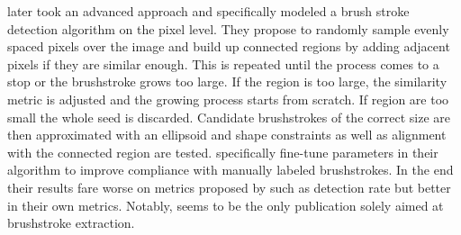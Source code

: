 \citeauthor*{lamberti} later took an advanced approach and specifically modeled a brush stroke detection algorithm on the pixel level.
They propose to randomly sample evenly spaced pixels over the image and build up connected regions by adding adjacent pixels if they are similar enough.
This is repeated until the process comes to a stop or the brushstroke grows too large.
If the region is too large, the similarity metric is adjusted and the growing process starts from scratch.
If region are too small the whole seed is discarded.
Candidate brushstrokes of the correct size are then approximated with an ellipsoid and shape constraints as well as alignment with the connected region are tested.
\citeauthor*{lamberti} specifically fine-tune parameters in their algorithm to improve compliance with manually labeled brushstrokes.
In the end their results fare worse on metrics proposed by \citeauthor{rhythmic} such as detection rate but better in their own metrics.
Notably, \citeauthor*{lamberti} seems to be the only publication solely aimed at brushstroke extraction.

